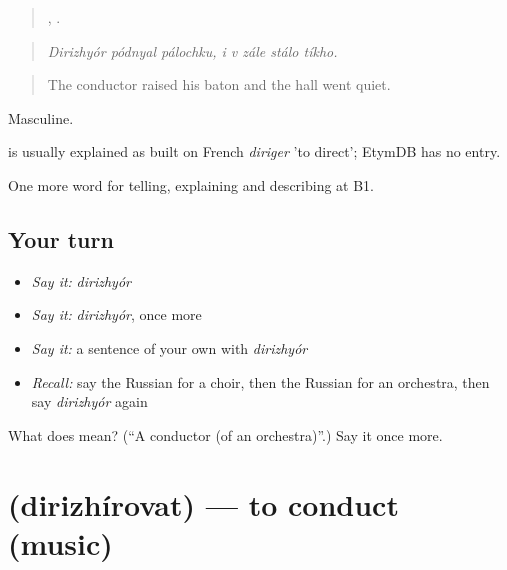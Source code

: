 \begin{quote}
  ,     .
\end{quote}

\begin{quote}
\emph{Dirizhyór pódnyal pálochku, i v zále stálo tíkho.}
\end{quote}

\begin{quote}
The conductor raised his baton and the hall went quiet.
\end{quote}

Masculine.

\begin{cousinweb}
\emph{} is usually explained as built on French \emph{diriger} 'to direct'; EtymDB has no entry.
\end{cousinweb}

\begin{grammarlens}[title={What you've built}]
One more word for telling, explaining and describing at B1.
\end{grammarlens}

\subsection*{Your turn}
\begin{itemize}
\raggedright
  \item \emph{Say it:} \emph{dirizhyór}
  \item \emph{Say it:} \emph{dirizhyór}, once more
  \item \emph{Say it:} a sentence of your own with \emph{dirizhyór}
  \item \emph{Recall:} say the Russian for a choir, then the Russian for an orchestra, then say \emph{dirizhyór} again
\end{itemize}

\begin{tcolorbox}[breakable,colback=teal!4,colframe=teal!35!black,title={Before you move on}]
What does  mean? (\textquotedblleft{}A conductor (of an orchestra)\textquotedblright{}.) Say it once more.
\end{tcolorbox}
\section[\texorpdfstring{\ru{дирижировать} (dirizhírovat)}{дирижировать (dirizhírovat)}]{ (dirizhírovat) — to conduct (music)}

